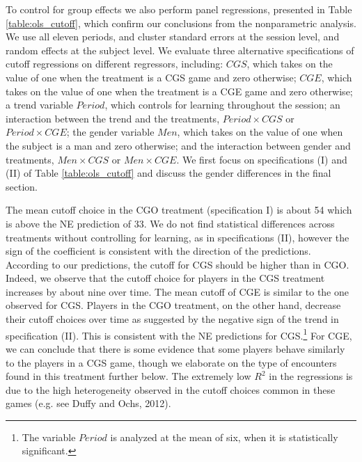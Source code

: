 \documentclass[12pt, letterpaper]{article}
\theoremstyle{plain}
\begin{document}
To control for group effects we also perform panel regressions, presented in Table \ref{table:ols_cutoff}, which confirm our conclusions from the nonparametric analysis. We use all eleven periods, and cluster standard errors at the session level, and random effects at the subject level. We evaluate three alternative specifications of cutoff regressions on different regressors, including: $CGS$, which takes on the value of one when the treatment is a CGS game and zero otherwise; $CGE$, which takes on the value of one when the treatment is a CGE game and zero otherwise; a trend variable $Period$, which controls for learning throughout the session; an interaction between the trend and the treatments, $Period \times CGS$ or $Period \times CGE$; the gender variable $Men$, which takes on the value of one when the subject is a man and zero otherwise; and the interaction between gender and treatments, $Men \times CGS$ or $Men \times CGE$. We first focus on specifications (I) and (II) of Table \ref{table:ols_cutoff} and discuss the gender differences in the final section. 

The mean cutoff choice in the CGO treatment (specification I) is about 54 which is above the NE prediction of 33. We do not find statistical differences across treatments without controlling for learning, as in specifications (II), however the sign of the coefficient is consistent with the direction of the predictions. According to our predictions, the cutoff for CGS should be higher than in CGO. Indeed, we observe that the cutoff choice for players in the CGS treatment increases by about nine over time. The mean cutoff of CGE is similar to the one observed for CGS. Players in the CGO treatment, on the other hand, decrease their cutoff choices over time as suggested by the negative sign of the trend in specification (II). This is consistent with the NE predictions for CGS.\footnote{The variable $Period$ is analyzed at the mean of six, when it is statistically significant.} For CGE, we can conclude that there is some evidence that some players behave similarly to the players in a CGS game, though we elaborate on the type of encounters found in this treatment further below. The extremely low $R^2$ in the regressions is due to the high heterogeneity observed in the cutoff choices common in these games (e.g. see Duffy and Ochs, 2012).
\end{document}
